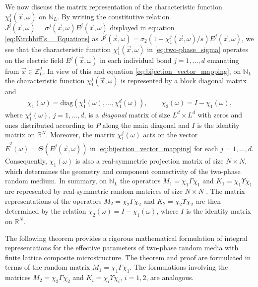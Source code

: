 \documentclass{cmslatex}
\begin{document}
We now discuss the matrix representation of the characteristic
function $\chi_1^j(\vec{x},\omega)$ on $\mathbb{N}_L$. By writing the
constitutive relation $J^j(\vec{x},\omega)=\sigma^j(\vec{x},\omega)E^j(\vec{x},\omega)$
displayed in equation \eqref{eq:Kirchhiff's__Equations} as
$J^j(\vec{x},\omega)=\sigma_2(1-\chi_1^j(\vec{x},\omega)/s)E^j(\vec{x},\omega)$, 
we see that the characteristic
function $\chi_1^j(\vec{x},\omega)$ in \eqref{eq:two-phase_sigma} operates
on the electric field
$E^j(\vec{x},\omega)$ in each individual bond $j=1,\ldots,d$ emanating from
$\vec{x}\in\mathbb{Z}_L^d$. In view of this and equation
\eqref{eq:bijection_vector_mapping}, on
$\mathbb{N}_L$ the characteristic function $\chi_1^j(\vec{x},\omega)$ is
represented by a block diagonal matrix and
%
\begin{align}\label{eq:block_diag_chi}  
  \chi_1(\omega)=\text{diag}(\chi_1^1(\omega),\ldots,\chi_1^d(\omega)), \qquad
  \chi_2(\omega)=I-\chi_1(\omega),
\end{align}
%
where $\chi_1^j(\omega)$, $j=1,\ldots,d$, is a \emph{diagonal} matrix of size $L^d\times
L^d$ with zeros and ones distributed according to $P$ along the main
diagonal and $I$ is the identity matrix on $\mathbb{R}^N$. Moreover,
the matrix $\chi_1^j(\omega)$ acts on the vector 
$\vec{E}^j(\omega)=\Theta(E^j(\vec{x},\omega))$ in
\eqref{eq:bijection_vector_mapping} for each $j=1,\ldots,d$. Consequently, 
$\chi_1(\omega)$ is also a real-symmetric projection matrix of size $N\times N$,
which determines the geometry and component connectivity of the
two-phase random medium. In summary, on $\mathbb{N}_L$ the operators
$M_1=\chi_1\Gamma\chi_1$ and $K_1=\chi_1\Upsilon\chi_1$ are represented by real-symmetric
random matrices of size $N\times N$
\cite{Golden:JBM:337,Murphy:JMP:063506}. The matrix
representations of the operators $M_2=\chi_2\Gamma\chi_2$ and $K_2=\chi_2\Upsilon\chi_2$ are
then determined by the relation $\chi_2(\omega)=I-\chi_1(\omega)$, where $I$ is the
identity matrix on $\mathbb{R}^N$.





The following theorem provides a rigorous mathematical formulation of
integral representations for the effective parameters of two-phase
random media with finite lattice composite microstructure. The theorem
and proof are formulated in terms of the random matrix
$M_1=\chi_1\Gamma\chi_1$. The formulations involving the matrices $M_2=\chi_2\Gamma\chi_2$
and $K_i=\chi_i\Upsilon\chi_i$, $i=1,2$, are analogous.  
\end{document}
